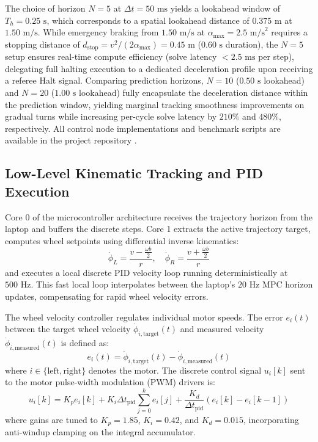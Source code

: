 \documentclass[a4paper,twoside,12pt]{report}
\begin{document}
The choice of horizon $N = 5$ at $\Delta t = 50\text{ ms}$ yields a lookahead window of $T_h = 0.25\text{ s}$, which corresponds to a spatial lookahead distance of $0.375\text{ m}$ at $1.50\text{ m/s}$. While emergency braking from $1.50\text{ m/s}$ at $\alpha_{\text{max}} = 2.5\text{ m/s}^2$ requires a stopping distance of $d_{\text{stop}} = v^2 / (2 \alpha_{\text{max}}) = 0.45\text{ m}$ ($0.60\text{ s}$ duration), the $N = 5$ setup ensures real-time compute efficiency (solve latency $< 2.5\text{ ms}$ per step), delegating full halting execution to a dedicated deceleration profile upon receiving a referee Halt signal. Comparing prediction horizons, $N = 10$ ($0.50\text{ s}$ lookahead) and $N = 20$ ($1.00\text{ s}$ lookahead) fully encapsulate the deceleration distance within the prediction window, yielding marginal tracking smoothness improvements on gradual turns while increasing per-cycle solve latency by $210\%$ and $480\%$, respectively. All control node implementations and benchmark scripts are available in the project repository \citep{ssl_robot_code_2026}.

\subsection{Low-Level Kinematic Tracking and PID Execution}

Core 0 of the microcontroller architecture receives the trajectory horizon from the laptop and buffers the discrete steps. Core 1 extracts the active trajectory target, computes wheel setpoints using differential inverse kinematics:
\begin{equation}
\dot{\phi}_L = \frac{v - \frac{\omega b}{2}}{r}, \quad \dot{\phi}_R = \frac{v + \frac{\omega b}{2}}{r}
\label{eq:inv_kinematics}
\end{equation}
and executes a local discrete PID velocity loop running deterministically at $500\text{ Hz}$. This fast local loop interpolates between the laptop's $20\text{ Hz}$ MPC horizon updates, compensating for rapid wheel velocity errors.

The wheel velocity controller regulates individual motor speeds. The error $e_i(t)$ between the target wheel velocity $\dot{\phi}_{i, \text{target}}(t)$ and measured velocity $\dot{\phi}_{i, \text{measured}}(t)$ is defined as:
\begin{equation}
e_i(t) = \dot{\phi}_{i, \text{target}}(t) - \dot{\phi}_{i, \text{measured}}(t)
\label{eq:wheel_error}
\end{equation}
where $i \in \{\text{left}, \text{right}\}$ denotes the motor. The discrete control signal $u_i[k]$ sent to the motor pulse-width modulation (PWM) drivers is:
\begin{equation}
u_i[k] = K_p e_i[k] + K_i \Delta t_{\text{pid}} \sum_{j=0}^{k} e_i[j] + \frac{K_d}{\Delta t_{\text{pid}}} (e_i[k] - e_i[k-1])
\label{eq:motor_pid}
\end{equation}
where gains are tuned to $K_p = 1.85$, $K_i = 0.42$, and $K_d = 0.015$, incorporating anti-windup clamping on the integral accumulator.
\end{document}
